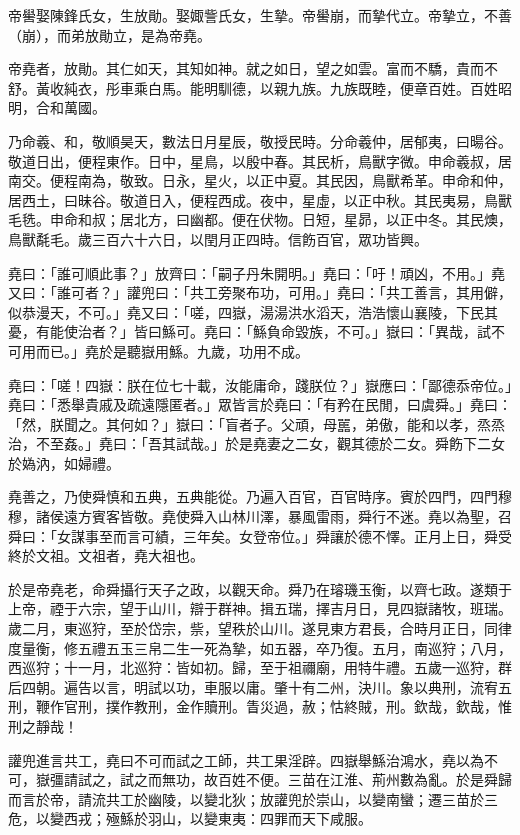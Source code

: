 \begin{pinyinscope}
帝嚳娶陳鋒氏女，生放勛。娶娵訾氏女，生摯。帝嚳崩，而摯代立。帝摯立，不善（崩），而弟放勛立，是為帝堯。

帝堯者，放勛。其仁如天，其知如神。就之如日，望之如雲。富而不驕，貴而不舒。黃收純衣，彤車乘白馬。能明馴德，以親九族。九族既睦，便章百姓。百姓昭明，合和萬國。

乃命羲、和，敬順昊天，數法日月星辰，敬授民時。分命羲仲，居郁夷，曰暘谷。敬道日出，便程東作。日中，星鳥，以殷中春。其民析，鳥獸字微。申命羲叔，居南交。便程南為，敬致。日永，星火，以正中夏。其民因，鳥獸希革。申命和仲，居西土，曰昧谷。敬道日入，便程西成。夜中，星虛，以正中秋。其民夷易，鳥獸毛毨。申命和叔；居北方，曰幽都。便在伏物。日短，星昴，以正中冬。其民燠，鳥獸氄毛。歲三百六十六日，以閏月正四時。信飭百官，眾功皆興。

堯曰：「誰可順此事？」放齊曰：「嗣子丹朱開明。」堯曰：「吁！頑凶，不用。」堯又曰：「誰可者？」讙兜曰：「共工旁聚布功，可用。」堯曰：「共工善言，其用僻，似恭漫天，不可。」堯又曰：「嗟，四嶽，湯湯洪水滔天，浩浩懷山襄陵，下民其憂，有能使治者？」皆曰鯀可。堯曰：「鯀負命毀族，不可。」嶽曰：「異哉，試不可用而已。」堯於是聽嶽用鯀。九歲，功用不成。

堯曰：「嗟！四嶽：朕在位七十載，汝能庸命，踐朕位？」嶽應曰：「鄙德忝帝位。」堯曰：「悉舉貴戚及疏遠隱匿者。」眾皆言於堯曰：「有矜在民閒，曰虞舜。」堯曰：「然，朕聞之。其何如？」嶽曰：「盲者子。父頑，母嚚，弟傲，能和以孝，烝烝治，不至姦。」堯曰：「吾其試哉。」於是堯妻之二女，觀其德於二女。舜飭下二女於媯汭，如婦禮。

堯善之，乃使舜慎和五典，五典能從。乃遍入百官，百官時序。賓於四門，四門穆穆，諸侯遠方賓客皆敬。堯使舜入山林川澤，暴風雷雨，舜行不迷。堯以為聖，召舜曰：「女謀事至而言可績，三年矣。女登帝位。」舜讓於德不懌。正月上日，舜受終於文祖。文祖者，堯大祖也。

於是帝堯老，命舜攝行天子之政，以觀天命。舜乃在璿璣玉衡，以齊七政。遂類于上帝，禋于六宗，望于山川，辯于群神。揖五瑞，擇吉月日，見四嶽諸牧，班瑞。歲二月，東巡狩，至於岱宗，祡，望秩於山川。遂見東方君長，合時月正日，同律度量衡，修五禮五玉三帛二生一死為摯，如五器，卒乃復。五月，南巡狩；八月，西巡狩；十一月，北巡狩：皆如初。歸，至于祖禰廟，用特牛禮。五歲一巡狩，群后四朝。遍告以言，明試以功，車服以庸。肇十有二州，決川。象以典刑，流宥五刑，鞭作官刑，撲作教刑，金作贖刑。眚災過，赦；怙終賊，刑。欽哉，欽哉，惟刑之靜哉！

讙兜進言共工，堯曰不可而試之工師，共工果淫辟。四嶽舉鯀治鴻水，堯以為不可，嶽彊請試之，試之而無功，故百姓不便。三苗在江淮、荊州數為亂。於是舜歸而言於帝，請流共工於幽陵，以變北狄；放讙兜於崇山，以變南蠻；遷三苗於三危，以變西戎；殛鯀於羽山，以變東夷：四罪而天下咸服。


\end{pinyinscope}
